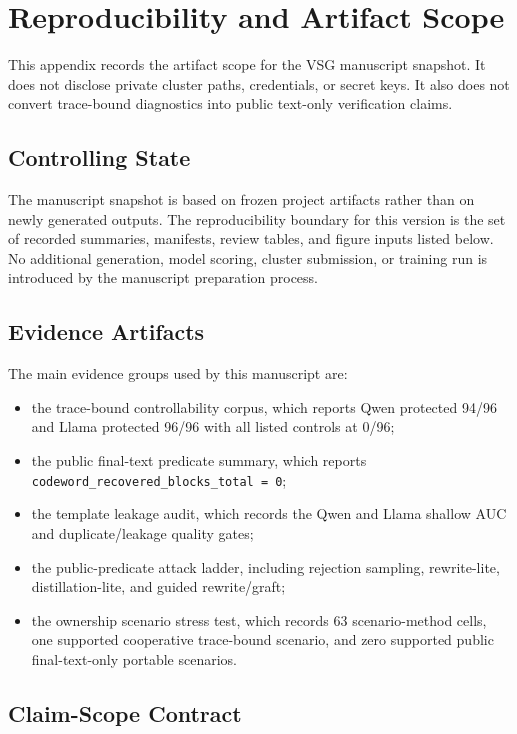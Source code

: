 \section{Reproducibility and Artifact Scope}
\label{app:reproducibility}

This appendix records the artifact scope for the VSG manuscript snapshot.  It
does not disclose private cluster paths, credentials, or secret keys.  It also
does not convert trace-bound diagnostics into public text-only verification
claims.

\subsection{Controlling State}

The manuscript snapshot is based on frozen project artifacts rather than on
newly generated outputs.  The reproducibility boundary for this version is the
set of recorded summaries, manifests, review tables, and figure inputs listed
below.  No additional generation, model scoring, cluster submission, or
training run is introduced by the manuscript preparation process.

\subsection{Evidence Artifacts}

The main evidence groups used by this manuscript are:
\begin{itemize}
\item the trace-bound controllability corpus, which reports Qwen protected
94/96 and Llama protected 96/96 with all listed controls at 0/96;
\item the public final-text predicate summary, which reports
\texttt{codeword\_recovered\_blocks\_total = 0};
\item the template leakage audit, which records the Qwen and Llama shallow AUC
and duplicate/leakage quality gates;
\item the public-predicate attack ladder, including rejection sampling,
rewrite-lite, distillation-lite, and guided rewrite/graft;
\item the ownership scenario stress test, which records 63 scenario-method
cells, one supported cooperative trace-bound scenario, and zero supported
public final-text-only portable scenarios.
\end{itemize}

\subsection{Claim-Scope Contract}

